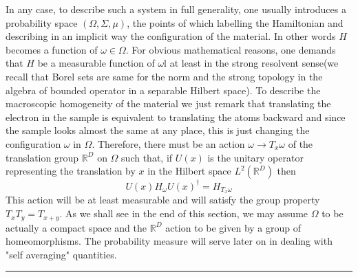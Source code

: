 In any case, to describe such a system in full generality, one usually introduces a probability space $(\Omega, \Sigma, \mu)$, the points of which labelling the Hamiltonian and describing in an implicit way the configuration of the material. In other words $H$ becomes a function of $\omega\in \Omega$. For obvious mathematical reasons, one demands that $H$ be a measurable function of $\omega$l at least in the strong resolvent sense(we recall that Borel sets are same for the norm and the strong topology in the algebra of bounded operator in a separable Hilbert space). To describe the macroscopic homogeneity of the material we just remark that translating the electron in the sample is equivalent to translating the atoms backward and since the sample looks almost the same at any place, this is just changing the configuration $\omega$ in $\Omega$. Therefore, there must be an action $\omega\rightarrow T_x\omega$ of the translation group $\mathbb{R}^D$ on $\Omega$ such that, if $U(x)$ is the unitary operator representing the translation by $x$ in the Hilbert space $L^2(\mathbb{R}^D)$ then
\begin{equation}
U(x)H_\omega U(x)^\dagger = H_{T_x\omega}
\end{equation}
This action will be at least measurable and will satisfy the group property $T_{x}T_y=T_{x+y}$. As we shall see in the end of this section, we may assume $\Omega$ to be actually a compact space and the $\mathbb{R}^D$ action to be given by a group of homeomorphisms. The probability measure will serve later on in dealing with "self averaging" quantities.
\noindent\rule{\textwidth}{1pt}
\newline